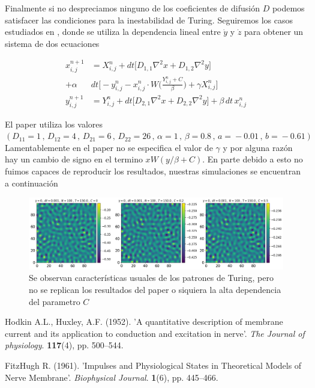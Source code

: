 \documentclass[11pt,letterpaper]{article}
\begin{document}
\begin{multicols*}{2}
Finalmente si no despreciamos ninguno de los coeficientes de difusión $D$ podemos satisfacer las condiciones para la inestabilidad de Turing. Seguiremos los casos estudiados en \cite{Buscarino2018}, donde se utiliza la dependencia lineal entre $\dot{y}$ y $\dot{z}$ para obtener un sistema de dos ecuaciones

\begin{align}
x^{n+1}_{i,j} &= X^{n}_{i,j} + dt\bigg[ D_{1,1} \nabla^2 x + D_{1,2} \nabla^2 y\bigg]  \nonumber\\
+  \alpha\,&dt\bigg[-y^{n}_{i,j} - x^{n}_{i,j}\cdot W\bigg(\frac{Y^{n}_{i,j}+C}{\beta}\bigg) + \gamma X^{n}_{i,j} \bigg] \\
y^{n+1}_{i,j} &= Y^{n}_{i,j} + dt\bigg[ D_{2,1} \nabla^2 x + D_{2,2} \nabla^2 y\bigg] + \beta\,dt\,x^{n}_{i,j} \nonumber
\end{align} 

El paper utiliza los valores $(D_{11}\!=\!1\,,\,D_{12}\!=\!4\,,\,D_{21}\!=\!6\,,\,D_{22}\!=\!26 \,,\,  \alpha\!=\!1 \,,\,\beta\!=\!0.8 \,,\, a\!=\!-0.01 \,,\, b\!=\!-0.61)$ Lamentablemente en el paper no se especifica el valor de $\gamma$ y por alguna razón hay un cambio de signo en el termino $xW(y/\beta + C)$. En parte debido a esto no fuimos capaces de reproducir los resultados, nuestras simulaciones se encuentran a continuación

\begin{figure}[H]
    \centering
    \includegraphics[scale=0.24]{Turing.png}
    \caption{Se observan características usuales de los patrones de Turing, pero no se replican los resultados del paper o siquiera la alta dependencia del parametro $C$}
    \label{Fig:SphericalWaves}
\end{figure}

\begin{thebibliography}{9}
 Hodkin A.L., Huxley, A.F. (1952). 'A quantitative description of membrane current and its application to conduction and excitation in nerve'. \textit{The Journal of physiology}. \textbf{117}(4), pp. 500–544.

 FitzHugh R. (1961). 'Impulses and Physiological States in Theoretical Models of Nerve Membrane'. \textit{Biophysical Journal}. \textbf{1}(6), pp. 445–466.


\end{thebibliography}
\end{multicols*}
\end{document}
